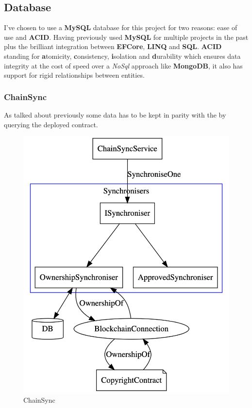 \subsection{Database}

I've chosen to use a \textbf{MySQL} database for this project for two reasons: ease of use and \textbf{ACID}. Having previously used \textbf{MySQL} for multiple projects in the past plus the brilliant integration between \textbf{EFCore}, \textbf{LINQ} and \textbf{SQL}. \textbf{ACID} standing for \textbf{a}tomicity, \textbf{c}onsistency, \textbf{i}solation and \textbf{d}urability which ensures data integrity at the cost of speed over a \textit{NoSql} approach like \textbf{MongoDB}, it also has support for rigid relationships between entities.

\subsubsection{ChainSync}
\label{sec:chainSync}

As talked about previously some data has to be kept in parity with the  by querying the deployed contract.

\begin{figure}[H]
\caption{ChainSync}
\centering
\includegraphics[width=\textwidth,height=0.5\textheight,keepaspectratio]{images/operational/chain-sync}
\end{figure}

